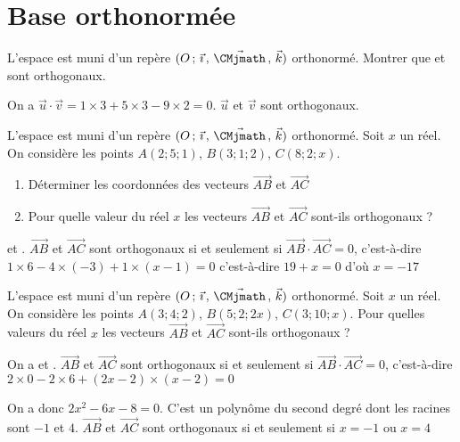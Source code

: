 \documentclass[11pt,fleqn, openany]{book} %
\begin{document}
\section*{Base orthonormée}



\begin{exercise}L'espace est muni d'un repère $\Oijk$ orthonormé. Montrer que  et  sont orthogonaux.\end{exercise}

\begin{solution}On a $\vec u \cdot \vec v = 1 \times 3 + 5 \times 3 - 9 \times 2 =0$. $\vec u$ et $\vec v$ sont orthogonaux.\end{solution}



\begin{exercise}L'espace est muni d'un repère $\Oijk$ orthonormé. Soit $x$ un réel. On considère les points $A(2;5;1)$, $B(3;1;2)$, $C(8;2;x)$. 

\begin{enumerate}
\item Déterminer les coordonnées des vecteurs $\overrightarrow{AB}$ et $\overrightarrow{AC}$
\item Pour quelle valeur du réel $x$ les vecteurs $\overrightarrow{AB}$ et $\overrightarrow{AC}$ sont-ils orthogonaux ?
\end{enumerate}
\end{exercise}

\begin{solution}  et . $\overrightarrow{AB}$ et $\overrightarrow{AC}$ sont orthogonaux si et seulement si $\overrightarrow{AB}\cdot \overrightarrow{AC}=0$, c'est-à-dire $1 \times 6 -4 \times (-3) + 1 \times (x-1)=0$ c'est-à-dire $19+x=0$ d'où $x=-17$\end{solution}




\begin{exercise}L'espace est muni d'un repère $\Oijk$ orthonormé. Soit $x$ un réel. On considère les points $A(3;4;2)$, $B(5;2;2x)$, $C(3;10;x)$. Pour quelles valeurs du réel $x$ les vecteurs $\overrightarrow{AB}$ et $\overrightarrow{AC}$ sont-ils orthogonaux ?\end{exercise}

\begin{solution}On a  et . $\overrightarrow{AB}$ et $\overrightarrow{AC}$ sont orthogonaux si et seulement si $\overrightarrow{AB}\cdot \overrightarrow{AC}=0$, c'est-à-dire $2 \times 0 -2\times 6 +(2x-2) \times (x-2)=0$

On a donc $2x^2-6x-8=0$. C'est un polynôme du second degré dont les racines sont $-1$ et $4$. $\overrightarrow{AB}$ et $\overrightarrow{AC}$ sont orthogonaux si et seulement si $x=-1$ ou $x=4$\end{solution}
\end{document}
